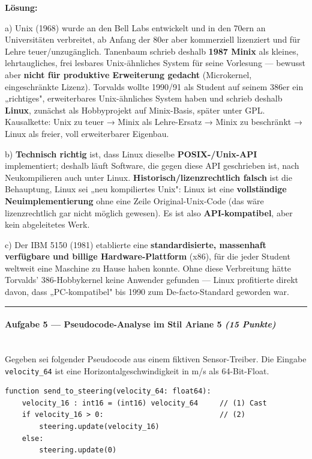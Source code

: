 \documentclass[11pt, a4paper]{article}
\begin{document}
\textbf{Lösung:}


a) Unix (1968) wurde an den Bell Labs entwickelt und in den 70ern an Universitäten verbreitet, ab Anfang der 80er aber kommerziell lizenziert und für Lehre teuer/unzugänglich. Tanenbaum schrieb deshalb \textbf{1987 Minix} als kleines, lehrtaugliches, frei lesbares Unix-ähnliches System für seine Vorlesung — bewusst aber \textbf{nicht für produktive Erweiterung gedacht} (Microkernel, eingeschränkte Lizenz). Torvalds wollte 1990/91 als Student auf seinem 386er ein „richtiges", erweiterbares Unix-ähnliches System haben und schrieb deshalb \textbf{Linux}, zunächst als Hobbyprojekt auf Minix-Basis, später unter GPL. Kausalkette: Unix zu teuer → Minix als Lehre-Ersatz → Minix zu beschränkt → Linux als freier, voll erweiterbarer Eigenbau.


b) \textbf{Technisch richtig} ist, dass Linux dieselbe \textbf{POSIX-/Unix-API} implementiert; deshalb läuft Software, die gegen diese API geschrieben ist, nach Neukompilieren auch unter Linux. \textbf{Historisch/lizenzrechtlich falsch} ist die Behauptung, Linux sei „neu kompiliertes Unix": Linux ist eine \textbf{vollständige Neuimplementierung} ohne eine Zeile Original-Unix-Code (das wäre lizenzrechtlich gar nicht möglich gewesen). Es ist also \textbf{API-kompatibel}, aber kein abgeleitetes Werk.


c) Der IBM 5150 (1981) etablierte eine \textbf{standardisierte, massenhaft verfügbare und billige Hardware-Plattform} (x86), für die jeder Student weltweit eine Maschine zu Hause haben konnte. Ohne diese Verbreitung hätte Torvalds' 386-Hobbykernel keine Anwender gefunden — Linux profitierte direkt davon, dass „PC-kompatibel" bis 1990 zum De-facto-Standard geworden war.



\noindent\textcolor{rulegray}{\rule{\linewidth}{0.4pt}}


\paragraph{Aufgabe 5 — Pseudocode-Analyse im Stil Ariane 5 \textit{(15 Punkte)}}\mbox{}\\[2pt]

Gegeben sei folgender Pseudocode aus einem fiktiven Sensor-Treiber. Die Eingabe \texttt{velocity\_64} ist eine Horizontalgeschwindigkeit in m/s als 64-Bit-Float.


\begin{lstlisting}
function send_to_steering(velocity_64: float64):
    velocity_16 : int16 = (int16) velocity_64     // (1) Cast
    if velocity_16 > 0:                           // (2)
        steering.update(velocity_16)
    else:
        steering.update(0)
\end{lstlisting}
\end{document}
